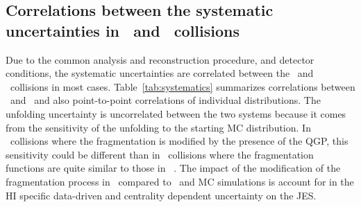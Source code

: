 

\subsection{Correlations between the systematic uncertainties in \pbpb\ and \pp\ collisions}

Due to the common analysis and reconstruction procedure, and detector conditions, the systematic uncertainties are correlated between the \pp\ and
\pbpb\ collisions in most cases. Table~\ref{tab:systematics} summarizes correlations between \pp\ and \PbPb\ and also point-to-point correlations of individual distributions. The unfolding uncertainty is uncorrelated between the two systems because it
comes from the sensitivity of the unfolding to the starting MC distribution. In \pbpb\ collisions where the fragmentation is modified by the presence of the QGP, this sensitivity could be different than in \pp\ collisions where the fragmentation functions are quite similar to those in \pythiaeight~\cite{Aaboud:2017tke}. The impact of the modification of the fragmentation process in \PbPb\ compared to \pp\ and MC simulations is account for in the HI specific data-driven and centrality dependent uncertainty on the JES.

